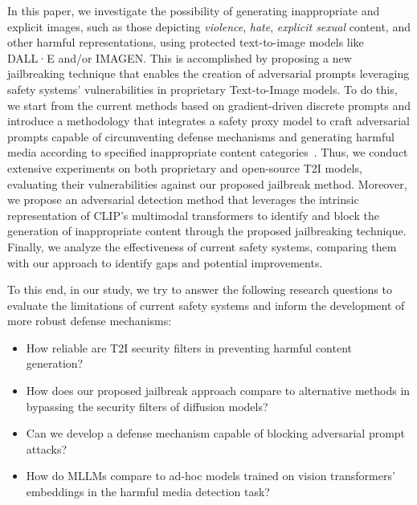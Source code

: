\documentclass[acmsmall]{acmart}
\newcommand{\dalle}{DALL·E\xspace}
\newcommand{\imagen}{IMAGEN\xspace}
\begin{document}
In this paper, we investigate the possibility of generating inappropriate and explicit images, such as those depicting \textit{violence}, \textit{hate}, \textit{explicit sexual} content, and other harmful representations, using protected text-to-image models like \dalle and/or \imagen. This is accomplished by proposing a new jailbreaking technique that enables the creation of adversarial prompts leveraging safety systems' vulnerabilities in proprietary Text-to-Image models.
To do this, we start from the current methods based on gradient-driven discrete prompts and introduce a methodology that integrates a safety proxy model to craft adversarial prompts capable of circumventing defense mechanisms and generating harmful media according to specified inappropriate content categories~\cite{daras2022hidden}. Thus, we conduct extensive experiments on both proprietary and open-source T2I models, evaluating their vulnerabilities against our proposed jailbreak method. Moreover, we propose an adversarial detection method that leverages the intrinsic representation of CLIP's multimodal transformers to identify and block the generation of inappropriate content through the proposed jailbreaking technique.
Finally, we analyze the effectiveness of current safety systems, comparing them with our approach to identify gaps and potential improvements. 

To this end, in our study, we try to answer the following research questions to evaluate the limitations of current safety systems and inform the development of more robust defense mechanisms:

\begin{itemize}
    \item[RQ1:] How reliable are T2I security filters in preventing harmful content generation? 
    \item[RQ2:] How does our proposed jailbreak approach compare to alternative methods in bypassing the security filters of diffusion models?
    \item[RQ3:] Can we develop a defense mechanism capable of blocking adversarial prompt attacks?
    \item[RQ4:] How do MLLMs compare to ad-hoc models trained on vision transformers' embeddings in the harmful media detection task?
\end{itemize}
\end{document}
